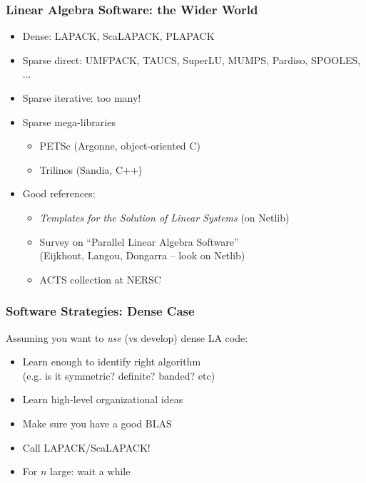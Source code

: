 \documentclass{beamer}
\begin{document}
\begin{frame}
  \frametitle{Linear Algebra Software: the Wider World}

  \begin{itemize}
  \item Dense: LAPACK, ScaLAPACK, PLAPACK
  \item Sparse direct: UMFPACK, TAUCS, SuperLU, MUMPS, Pardiso, SPOOLES, ...
  \item Sparse iterative: too many!
  \item Sparse mega-libraries
    \begin{itemize}
    \item PETSc (Argonne, object-oriented C)
    \item Trilinos (Sandia, C++)
    \end{itemize}
  \item Good references:
    \begin{itemize}
    \item {\em Templates for the Solution of Linear Systems} 
      (on Netlib)
    \item Survey on ``Parallel Linear Algebra Software'' \\
      (Eijkhout, Langou, Dongarra -- look on Netlib)
    \item ACTS collection at NERSC
    \end{itemize}
  \end{itemize}
\end{frame}


\begin{frame}
  \frametitle{Software Strategies: Dense Case}

  Assuming you want to {\em use} (vs develop) dense LA code:
  \begin{itemize}
  \item Learn enough to identify right algorithm \\
    (e.g. is it symmetric? definite? banded? etc)
  \item Learn high-level organizational ideas
  \item Make sure you have a good BLAS
  \item Call LAPACK/ScaLAPACK!
  \item For $n$ large: wait a while
  \end{itemize}

\end{frame}
\end{document}
